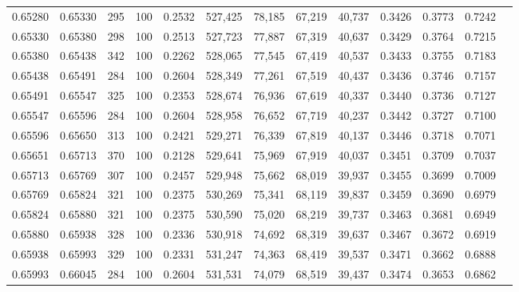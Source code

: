 \begin{tabular}{rrrrrrrrrrrrr}
0.65280 & 0.65330 &   295 & 100 &                                     0.2532 & 527,425 &  78,185 &  67,219 &  40,737 & 0.3426 & 0.3773 & 0.7242 \\
0.65330 & 0.65380 &   298 & 100 &                                     0.2513 & 527,723 &  77,887 &  67,319 &  40,637 & 0.3429 & 0.3764 & 0.7215 \\
0.65380 & 0.65438 &   342 & 100 &                                     0.2262 & 528,065 &  77,545 &  67,419 &  40,537 & 0.3433 & 0.3755 & 0.7183 \\
0.65438 & 0.65491 &   284 & 100 &                                     0.2604 & 528,349 &  77,261 &  67,519 &  40,437 & 0.3436 & 0.3746 & 0.7157 \\
0.65491 & 0.65547 &   325 & 100 &                                     0.2353 & 528,674 &  76,936 &  67,619 &  40,337 & 0.3440 & 0.3736 & 0.7127 \\
0.65547 & 0.65596 &   284 & 100 &                                     0.2604 & 528,958 &  76,652 &  67,719 &  40,237 & 0.3442 & 0.3727 & 0.7100 \\
0.65596 & 0.65650 &   313 & 100 &                                     0.2421 & 529,271 &  76,339 &  67,819 &  40,137 & 0.3446 & 0.3718 & 0.7071 \\
0.65651 & 0.65713 &   370 & 100 &                                     0.2128 & 529,641 &  75,969 &  67,919 &  40,037 & 0.3451 & 0.3709 & 0.7037 \\
0.65713 & 0.65769 &   307 & 100 &                                     0.2457 & 529,948 &  75,662 &  68,019 &  39,937 & 0.3455 & 0.3699 & 0.7009 \\
0.65769 & 0.65824 &   321 & 100 &                                     0.2375 & 530,269 &  75,341 &  68,119 &  39,837 & 0.3459 & 0.3690 & 0.6979 \\
0.65824 & 0.65880 &   321 & 100 &                                     0.2375 & 530,590 &  75,020 &  68,219 &  39,737 & 0.3463 & 0.3681 & 0.6949 \\
0.65880 & 0.65938 &   328 & 100 &                                     0.2336 & 530,918 &  74,692 &  68,319 &  39,637 & 0.3467 & 0.3672 & 0.6919 \\
0.65938 & 0.65993 &   329 & 100 &                                     0.2331 & 531,247 &  74,363 &  68,419 &  39,537 & 0.3471 & 0.3662 & 0.6888 \\
0.65993 & 0.66045 &   284 & 100 &                                     0.2604 & 531,531 &  74,079 &  68,519 &  39,437 & 0.3474 & 0.3653 & 0.6862 \\

\end{tabular}
